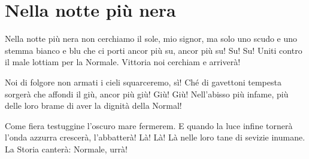 \section{Nella notte più nera}
\begin{canzone}
Nella notte più nera
non cerchiamo il sole, mio signor,
ma solo uno scudo e uno stemma bianco e blu
che ci porti ancor più su,
ancor più su!
Su! Su!
Uniti contro il male
lottiam per la Normale.
Vittoria noi cerchiam
e arriverà!

Noi di folgore non armati
i cieli squarceremo, sì!
Ché di gavettoni tempesta sorgerà
che affondi il \santanna giù,
ancor più giù!
Giù! Giù!
Nell'abisso più infame,
più delle loro brame
di aver la dignità
della Normal!

Come fiera testuggine
l'oscuro mare fermerem.
E quando la luce infine tornerà
l'onda azzurra crescerà,
l'abbatterà!
Là! Là!
Là nelle loro tane
di sevizie inumane.
La Storia canterà:
Normale, urrà!
\end{canzone}
